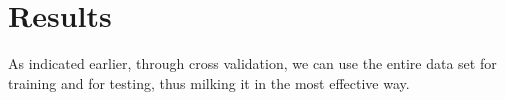 \chapter{Results}\label{results}
As indicated earlier, through cross validation, we can use the entire data set for training and for testing, thus milking it in the most effective way.



